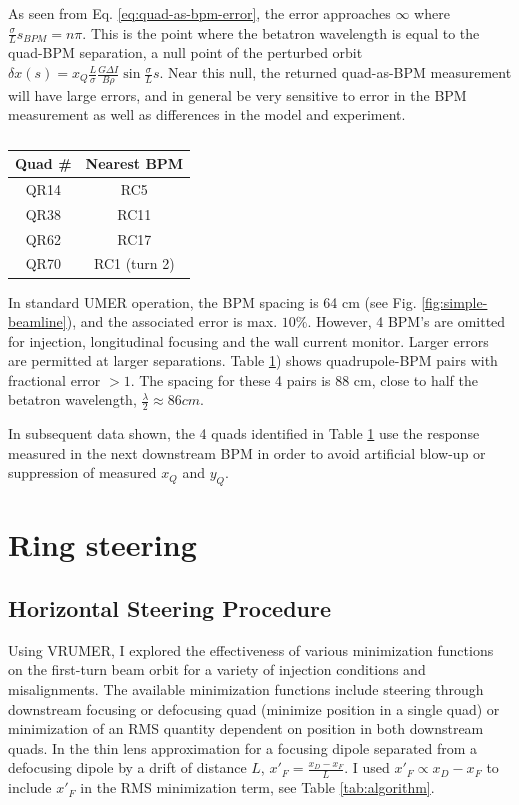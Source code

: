 As seen from Eq. \ref{eq:quad-as-bpm-error}, the error approaches $\infty$ where $\frac{\sigma}{L}s_{BPM} = n\pi$. This is the point where the betatron wavelength is equal to the quad-BPM separation, a null point of the perturbed orbit $\delta x(s) = x_Q \frac{L}{\sigma} \frac{G \Delta I}{B\rho} \sin{\frac{\sigma}{L}s}$. Near this null, the returned quad-as-BPM measurement will have large errors, and in general be very sensitive to error in the BPM measurement as well as differences in the model and experiment. 


\begin{table}
\centering
\caption{}
\label{tab:nulls}
\begin{tabular}{|c|c|}
Quad \# & Nearest BPM  \\
\hline
QR14 & RC5  \\
QR38 & RC11  \\
QR62 & RC17  \\
QR70 & RC1 (turn 2)  \\
\end{tabular}
\end{table}


In standard UMER operation, the BPM spacing is 64 cm (see Fig. \ref{fig:simple-beamline}), and the associated error is max. $10\%$. However, 4 BPM's are omitted for injection, longitudinal focusing and the wall current monitor. Larger errors are permitted at larger separations. 
Table \ref{tab:nulls}) shows quadrupole-BPM pairs with fractional error $>1$. The spacing for these 4 pairs is 88 cm, close to half the betatron wavelength, $\frac{\lambda}{2} \approx 86 cm$. 

In subsequent data shown, the 4 quads identified in Table \ref{tab:nulls} use the response measured in the next downstream BPM in order to avoid artificial blow-up or suppression of measured $x_Q$ and $y_Q$. 



\section{Ring steering} \label{sec:steering:ringsteering}




\subsection{Horizontal Steering Procedure}

Using VRUMER, I explored the effectiveness of various minimization functions on the first-turn beam orbit for a variety of injection conditions and misalignments. The available minimization functions include steering through downstream focusing or defocusing quad (minimize position in a single quad) or minimization of an RMS quantity dependent on position in both downstream quads. In the thin lens approximation for a focusing dipole separated from a defocusing dipole by a drift of distance $L$, $x'_F = \frac{x_D-x_F}{L}$. I used $x'_F \propto x_D-x_F$ to include $x'_F$ in the RMS minimization term, see Table \ref{tab:algorithm}.

